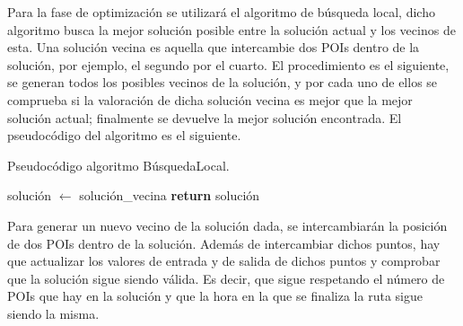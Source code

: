 Para la fase de optimización se utilizará el algoritmo de búsqueda local, dicho algoritmo busca la mejor solución posible entre la solución actual y los vecinos de esta. Una solución vecina es aquella que intercambie dos POIs dentro de la solución, por ejemplo, el segundo por el cuarto. El procedimiento es el siguiente, se generan todos los posibles vecinos de la solución, y por cada uno de ellos se comprueba si la valoración de dicha solución vecina es mejor que la mejor solución actual; finalmente se devuelve la mejor solución encontrada. El pseudocódigo del algoritmo es el siguiente.\newline

\begin{algorithm}[H]
	\caption{Pseudocódigo algoritmo BúsquedaLocal.}
	\label{alg:local_search}
	\begin{algorithmic}
			\State solución $\gets$ solución\_vecina
		\EndIf
		\EndFor
		\State \textbf{return} solución
		\EndFunction
	\end{algorithmic}
\end{algorithm}

\vspace{0.06in}
Para generar un nuevo vecino de la solución dada, se intercambiarán la posición de dos POIs dentro de la solución. Además de intercambiar dichos puntos, hay que actualizar los valores de entrada y de salida de dichos puntos y comprobar que la solución sigue siendo válida. Es decir, que sigue respetando el número de POIs que hay en la solución y que la hora en la que se finaliza la ruta sigue siendo la misma.



